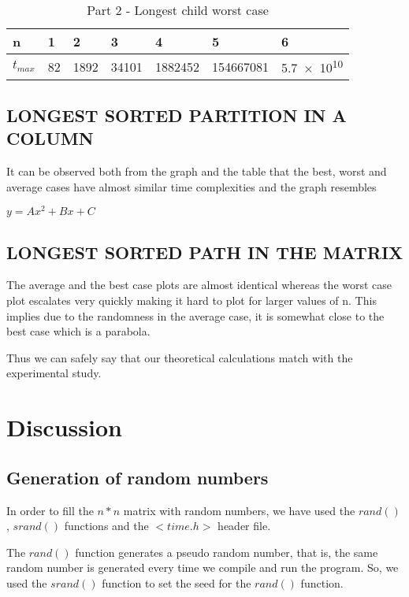 \documentclass[letterpaper, 11 pt, conference]{ieeeconf}  %
\begin{document}
\begin{table}[h!]
\fontsize{7.5}{11}\selectfont
\begin{center}
\begin{tabu} to 0.5
 \hline
 n & 1 & 2 & 3 & 4 & 5 & 6 \\
 \hline\hline
 $t_{max}$ & 82 & 1892 & 34101 & 1882452 & 154667081 & \num{5.7e10} \\
 \hline
\end{tabu}
\label{path_table_worst}
\caption{Part 2 - Longest child worst case}
\end{center}
\end{table}

\subsection*{LONGEST SORTED PARTITION IN A COLUMN}
It can be observed both from the graph and the table that the best, worst and average cases have almost similar time complexities and the graph resembles

\qquad \qquad \qquad $y = Ax^2 + Bx + C$

\subsection*{LONGEST SORTED PATH IN THE MATRIX}
The average and the best case plots are almost identical whereas the worst case plot escalates very quickly making it hard to plot for larger values of n. This implies due to the randomness in the average case, it is somewhat close to the best case which is a parabola.

Thus we can safely say that our theoretical calculations match with the experimental study.

\section{Discussion}

\subsection{Generation of random numbers}
In order to fill the $n*n$ matrix with random numbers, we have used the  $rand()$, $srand()$ functions and the $<time.h>$ header file.

The $rand()$ function generates a pseudo random number, that is, the same random number is generated every time we compile and run the program. 
So, we used the $srand()$ function to set the seed for the $rand()$ function.
\end{document}
